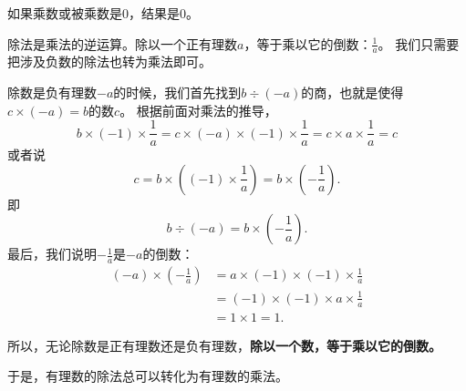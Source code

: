 \documentclass[12pt,UTF8]{ctexbook}
\theoremstyle{definition}
\theoremstyle{plain}
\begin{document}
如果乘数或被乘数是$0$，结果是$0$。

除法是乘法的逆运算。除以一个正有理数$a$，等于乘以它的倒数：$\frac{1}{a}$。
我们只需要把涉及负数的除法也转为乘法即可。

除数是负有理数$-a$的时候，我们首先找到$b \div (-a)$的商，也就是使得$c \times (-a) = b$的数$c$。
根据前面对乘法的推导，
$$ b \times (-1) \times \frac{1}{a} = c \times (-a) \times (-1) \times \frac{1}{a} = c \times a \times \frac{1}{a} = c$$
或者说
$$c = b\times \left((-1) \times \frac{1}{a}\right) = b\times \left(-\frac{1}{a}\right) .$$
即
$$b \div (-a) = b\times \left(-\frac{1}{a}\right). $$
最后，我们说明$-\frac{1}{a}$是$-a$的倒数：
\begin{align*}
    (-a) \times \left(-\frac{1}{a}\right) &= a \times (-1) \times (-1) \times \frac{1}{a} \\
    &= (-1)\times (-1) \times a \times \frac{1}{a} \\
    &= 1 \times 1 = 1.
\end{align*}

所以，无论除数是正有理数还是负有理数，\textbf{除以一个数，等于乘以它的倒数。}

\begin{center}
\end{center}

于是，有理数的除法总可以转化为有理数的乘法。
\end{document}
